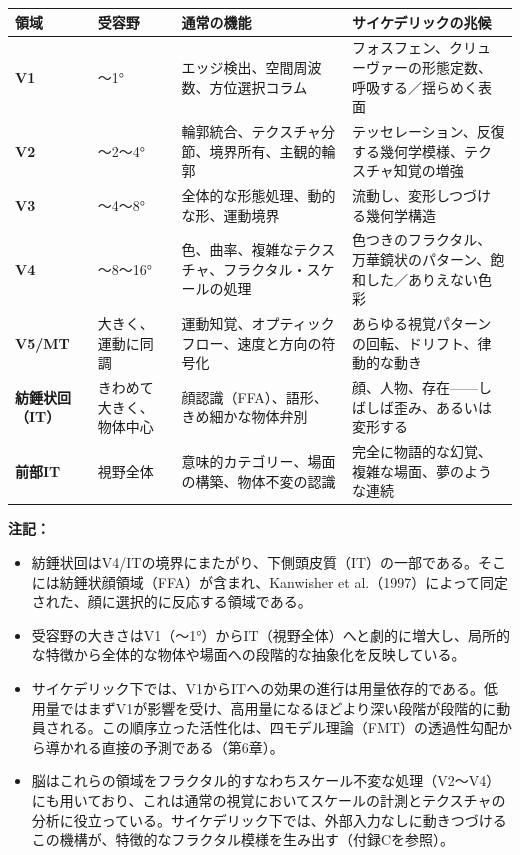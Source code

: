\documentclass[11pt, twoside, openright]{book}
\begin{document}
{\small
\noindent
\begin{tabularx}{\linewidth}{X X X X}
\toprule
\textbf{領域} & \textbf{受容野} & \textbf{通常の機能} & \textbf{サイケデリックの兆候} \\
\midrule
\textbf{V1} & 〜1° & エッジ検出、空間周波数、方位選択コラム & フォスフェン、クリューヴァーの形態定数、呼吸する／揺らめく表面 \\[4pt]
\textbf{V2} & 〜2〜4° & 輪郭統合、テクスチャ分節、境界所有、主観的輪郭 & テッセレーション、反復する幾何学模様、テクスチャ知覚の増強 \\[4pt]
\textbf{V3} & 〜4〜8° & 全体的な形態処理、動的な形、運動境界 & 流動し、変形しつづける幾何学構造 \\[4pt]
\textbf{V4} & 〜8〜16° & 色、曲率、複雑なテクスチャ、フラクタル・スケールの処理 & 色つきのフラクタル、万華鏡状のパターン、飽和した／ありえない色彩 \\[4pt]
\textbf{V5/MT} & 大きく、運動に同調 & 運動知覚、オプティックフロー、速度と方向の符号化 & あらゆる視覚パターンの回転、ドリフト、律動的な動き \\[4pt]
\textbf{紡錘状回（IT）} & きわめて大きく、物体中心 & 顔認識（FFA）、語形、きめ細かな物体弁別 & 顔、人物、存在------しばしば歪み、あるいは変形する \\[4pt]
\textbf{前部IT} & 視野全体 & 意味的カテゴリー、場面の構築、物体不変の認識 & 完全に物語的な幻覚、複雑な場面、夢のような連続 \\[4pt]
\bottomrule
\end{tabularx}
}


\textbf{注記：}
\begin{itemize}
  \item 紡錘状回はV4/ITの境界にまたがり、下側頭皮質（IT）の一部である。そこには紡錘状顔領域（FFA）が含まれ、Kanwisher et al.（1997）によって同定された、顔に選択的に反応する領域である。
  \item 受容野の大きさはV1（〜1°）からIT（視野全体）へと劇的に増大し、局所的な特徴から全体的な物体や場面への段階的な抽象化を反映している。
  \item サイケデリック下では、V1からITへの効果の進行は用量依存的である。低用量ではまずV1が影響を受け、高用量になるほどより深い段階が段階的に動員される。この順序立った活性化は、四モデル理論（FMT）の透過性勾配から導かれる直接の予測である（第6章）。
  \item 脳はこれらの領域をフラクタル的すなわちスケール不変な処理（V2〜V4）にも用いており、これは通常の視覚においてスケールの計測とテクスチャの分析に役立っている。サイケデリック下では、外部入力なしに動きつづけるこの機構が、特徴的なフラクタル模様を生み出す（付録Cを参照）。
\end{itemize}
\end{document}
